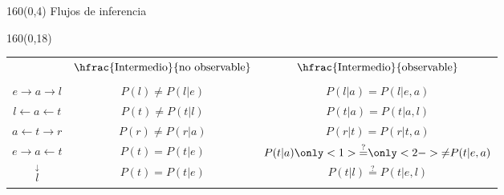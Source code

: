 \documentclass[shownotes,aspectratio=169]{beamer}
\begin{document}
\begin{frame}[plain]
\begin{textblock}{160}(0,4)
\centering \Large Flujos de inferencia
\end{textblock}

\begin{textblock}{160}(0,18)
\centering
 \begin{tabular}{c c|c}
 & $\hfrac{\text{Intermedio}}{\text{no observable}}$ &   $\hfrac{\text{Intermedio}}{\text{observable}}$ \\
 & & \\
 $ e \rightarrow a \rightarrow l $    & $P(l) \neq P(l|e)$ & $P(l|a) \overset{\phantom{?}}{=} P(l|e,a)$ \\ 
 $ l \leftarrow a \leftarrow t $      &  $P(t) \neq P(t|l)$  & $P(t|a) \overset{\phantom{?}}{=} P(t|a,l)$ \\ 
 $ a \leftarrow t \rightarrow r $     & $P(r) \neq P(r|a)$ & $P(r|t) \overset{\phantom{?}}{=} P(r|t,a)$ \\
 $ e \rightarrow a \leftarrow t $     & $P(t) \overset{\phantom{?}}{=}  P(t|e)$ & $P(t|a) \only<1>{\overset{?}{=}}\only<2->{\neq} P(t|e,a)$ \\
            $\overset{\downarrow}{l}$  & $P(t) \overset{\phantom{?}}{=}  P(t|e)$ & $P(t|l) \overset{?}{=} P(t|e,l)$
 \end{tabular} 
 \end{textblock}
 
\end{frame}
\end{document}
